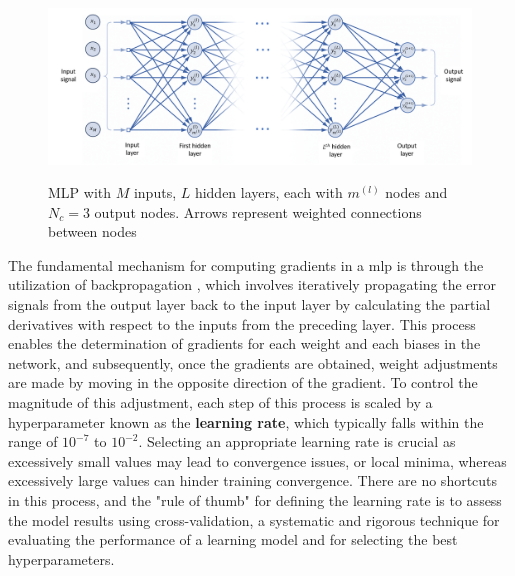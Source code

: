 \begin{figure}[htbp]
    \raggedright
        \caption{MLP with $M$ inputs, $L$ hidden layers, each with $m^{(l)}$ nodes and $N_c = 3$ output nodes. Arrows represent weighted connections between nodes}
        \includegraphics[width=1\textwidth]{resources/images/030-theoretical_framework/Framework_ann_mlp.png}
        \label{fig:frmwk_ann_mlp}
\end{figure}


The fundamental mechanism for computing gradients in a \gls{mlp} is through the utilization of backpropagation \cite{Rumelhart1986}, which involves iteratively propagating the error signals from the output layer back to the input layer by calculating the partial derivatives with respect to the inputs from the preceding layer. This process enables the determination of gradients for each weight and each biases in the network, and subsequently, once the gradients are obtained, weight adjustments are made by moving in the opposite direction of the gradient. To control the magnitude of this adjustment, each step of this process is scaled by a hyperparameter known as the \textbf{learning rate}, which typically falls within the range of $10^{-7}$ to $10^{-2}$. Selecting an appropriate learning rate is crucial as excessively small values may lead to convergence issues, or local minima, whereas excessively large values can hinder training convergence. There are no shortcuts in this process, and the "rule of thumb" for defining the learning rate is to assess the model results using cross-validation, a systematic and rigorous technique for evaluating the performance of a learning model and for selecting the best hyperparameters.

